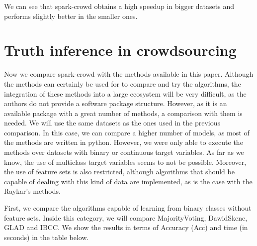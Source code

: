 \documentclass[letterpaper,10pt,english]{sphinxmanual}
\begin{document}
We can see that spark-crowd obtains a high speedup in bigger datasets and performs
slightly better in the smaller ones.


\section{Truth inference in crowdsourcing}
\label{\detokenize{package/other:id2}}
Now we compare spark-crowd with the methods available in this paper. Although the methods
can certainly be used for to compare and try the algorithms, the integration of these
methods into a large ecosystem will be very difficult, as the authors do not provide
a software package structure. However, as it is an available package with a great number
of methods, a comparison with them is needed. We will use the same datasets
as the ones used in the previous comparison. In this case, we can compare a higher
number of models, as most of the methods are written in python. However, we were only able
to execute the methods over datasets with binary or continuous target variables. As far as we
know, the use of multiclass target variables seems to not be possible. Moreover, the use of
feature sets is also restricted, although algorithms that should be capable of dealing with
this kind of data are implemented, as is the case with the Raykar’s methods.

First, we compare the algorithms capable of learning from binary classes without feature sets.
Inside this category, we will compare MajorityVoting, DawidSkene, GLAD and IBCC. We show the results
in terms of Accuracy (Acc) and time (in seconds) in the table below.
\end{document}
